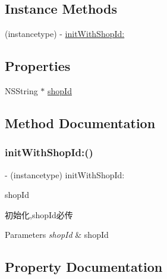 \subsection*{Instance Methods}
\begin{DoxyCompactItemize}
\item 
(instancetype) -\/ \mbox{\hyperlink{interface_a_l_p_t_b_shop_param_a93f57803cdc9b47116e425ecc80574e4}{init\+With\+Shop\+Id\+:}}
\end{DoxyCompactItemize}
\subsection*{Properties}
\begin{DoxyCompactItemize}
\item 
N\+S\+String $\ast$ \mbox{\hyperlink{interface_a_l_p_t_b_shop_param_a337ea4d45d65fb07b1c8ef7fbf14dcce}{shop\+Id}}
\end{DoxyCompactItemize}


\subsection{Method Documentation}
\mbox{\label{interface_a_l_p_t_b_shop_param_a93f57803cdc9b47116e425ecc80574e4}} 
\subsubsection{\texorpdfstring{init\+With\+Shop\+Id\+:()}{initWithShopId:()}}
{\footnotesize\ttfamily -\/ (instancetype) init\+With\+Shop\+Id\+: \begin{DoxyParamCaption}\item[{(N\+S\+String $\ast$)}]{shop\+Id }\end{DoxyParamCaption}}

初始化,shop\+Id必传


\begin{DoxyParams}{Parameters}
{\em shop\+Id} & shop\+Id \\
\hline
\end{DoxyParams}


\subsection{Property Documentation}
\mbox{\label{interface_a_l_p_t_b_shop_param_a337ea4d45d65fb07b1c8ef7fbf14dcce}} 
